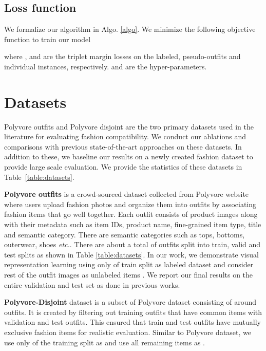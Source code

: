 \documentclass[sigconf]{acmart}
\newcommand{\etc}{\textit{etc.}}
\begin{document}
\subsection{Loss function}

We formalize our algorithm in Algo. \ref{algo}. We minimize the following objective function to train our model


where ,  and  are the triplet margin losses on the labeled, pseudo-outfits and individual instances, respectively.  and  are the hyper-parameters.

 
\section{Datasets}
Polyvore outfits \cite{eccv2018learning} and Polyvore disjoint \cite{eccv2018learning} are the two primary datasets used in the literature for evaluating fashion compatibility. We conduct our ablations and comparisons with previous state-of-the-art approaches on these datasets. In addition to these, we baseline our results on a newly created fashion dataset to provide large scale evaluation. We provide the statistics of these datasets in Table~\ref{table:datasets}.

\vspace{2mm}
\noindent \textbf{Polyvore outfits} is a crowd-sourced dataset collected from Polyvore website where users upload fashion photos and organize them into outfits by associating fashion items that go well together. Each outfit consists of product images along with their metadata such as item IDs, product name, fine-grained item type, title and semantic category. There are  semantic categories such as tops, bottoms, outerwear, shoes \etc. There are about a total of  outfits split into train, valid and test splits as shown in Table \ref{table:datasets}. 
In our work, we demonstrate visual representation learning using only  of train split as labeled dataset  and consider rest of the outfit images as unlabeled items . We report our final results on the entire validation and test set as done in previous works.

\vspace{2mm}
\noindent \textbf{Polyvore-Disjoint} dataset is a subset of Polyvore dataset consisting of around  outfits. It is created by filtering out training outfits that have common items with validation and test outfits. This ensured that train and test outfits have mutually exclusive fashion items for realistic evaluation. Similar to Polyvore dataset, we use only  of the training split as  and use all remaining items as . 
\end{document}
